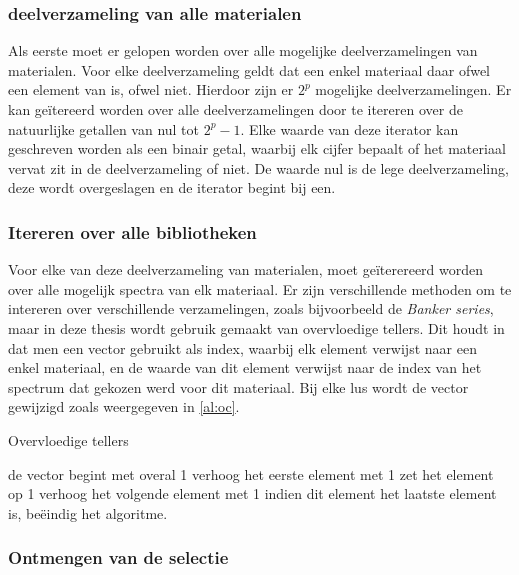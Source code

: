 \documentclass[12pt]{report}
\begin{document}
\subsubsection{deelverzameling van alle materialen}

Als eerste moet er gelopen worden over alle mogelijke deelverzamelingen van materialen. Voor elke deelverzameling geldt dat een enkel materiaal daar ofwel een element van is, ofwel niet. Hierdoor zijn er $2^p$ mogelijke deelverzamelingen. Er kan ge\"itereerd worden over alle deelverzamelingen door te itereren over de natuurlijke getallen van nul tot $2^p-1$. Elke waarde van deze iterator kan geschreven worden als een binair getal, waarbij elk cijfer bepaalt of het materiaal vervat zit in de deelverzameling of niet. De waarde nul is de lege deelverzameling, deze wordt overgeslagen en de iterator begint bij een.

\subsubsection{Itereren over alle bibliotheken}

Voor elke van deze deelverzameling van materialen, moet ge\"iterereerd worden over alle mogelijk spectra van elk materiaal. Er zijn verschillende methoden om te intereren over verschillende verzamelingen, zoals bijvoorbeeld de \textit{Banker series}, maar in deze thesis wordt gebruik gemaakt van overvloedige tellers\citep{mesma}. Dit houdt in dat men een vector gebruikt als index, waarbij elk element verwijst naar een enkel materiaal, en de waarde van dit element verwijst naar de index van het spectrum dat gekozen werd voor dit materiaal. Bij elke lus wordt de vector gewijzigd zoals weergegeven in \ref{al:oc}.

\begin{algorithm}
\caption{Overvloedige tellers\label{al:oc}}
\begin{algorithmic}[1]
\State de vector begint met overal 1
\State verhoog het eerste element met 1
\State zet het element op 1
\State verhoog het volgende element met 1
\State indien dit element het laatste element is, be\"eindig het algoritme.
\EndIf
\EndFor
\EndWhile
\end{algorithmic}
\end{algorithm}


\subsubsection{Ontmengen van de selectie}
\end{document}

